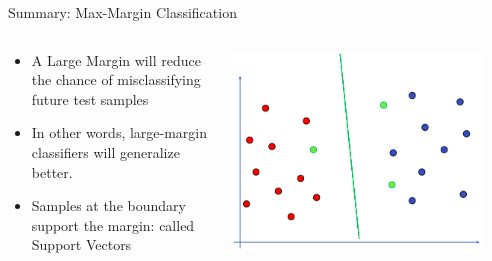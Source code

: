\documentclass[aspectratio=169, 14pt]{beamer}
\begin{document}
\begin{frame}[t]{Summary: Max-Margin Classification​}
\begin{columns}
	\begin{column}{0.55\textwidth}
        \begin{itemize}
	\item A Large Margin will reduce the chance of misclassifying future test samples
	\item In other words, large-margin classifiers will generalize better.​
        \item Samples at the boundary support the margin: called Support Vectors
	\end{itemize}
	\end{column}
	\begin{column}{0.45\textwidth}
		\vskip-0.5cm
		\includegraphics[width=0.9\textwidth]{SVM_NonLinear_Images/AIML_SVM_IMG5.png}
        \end{column}
\end{columns}

\end{frame}
\end{document}
